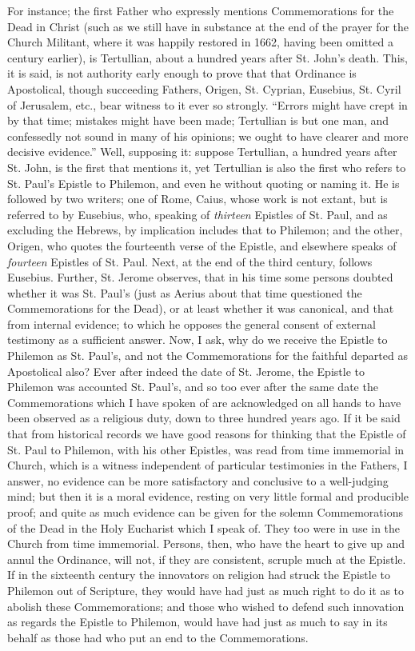 For instance; the first Father who expressly mentions
Commemorations for the Dead in Christ (such as we still have in
substance at the end of the prayer for the Church Militant, where it
was happily restored in 1662, having been omitted a century earlier),
is Tertullian, about a hundred years after St. John's death. This, it
is said, is not authority early enough to prove that that Ordinance is
Apostolical, though succeeding Fathers, Origen, St. Cyprian, Eusebius,
St. Cyril of Jerusalem, etc., bear witness to it ever so strongly.
``Errors might have crept in by that time; mistakes might have been
made; Tertullian is but one man, and confessedly not sound in many of
his opinions; we ought to have clearer and more decisive
evidence.'' Well, supposing it: suppose Tertullian, a hundred
years after St. John, is the first that mentions it, yet Tertullian is
also the first who refers to St. Paul's Epistle to Philemon, and even
he without quoting or naming it. He is followed by two writers; one of
Rome, Caius, whose work is not extant, but is referred to by Eusebius,
who, speaking of \emph{thirteen} Epistles of St. Paul, and as
excluding the Hebrews, by implication includes that to Philemon; and
the other, Origen, who quotes the fourteenth verse of the Epistle, and
elsewhere speaks of \emph{fourteen} Epistles of St. Paul. Next, at the
end of the third century, follows Eusebius. Further, St. Jerome
observes, that in his time some persons doubted whether it was St.
Paul's (just as Aerius about that time questioned the Commemorations
for the Dead), or at least whether it was canonical, and that from
internal evidence; to which he opposes the general consent of external
testimony as a sufficient answer. Now, I ask, why do we receive
the Epistle to Philemon as St. Paul's, and not the Commemorations for
the faithful departed as Apostolical also? Ever after indeed the date
of St. Jerome, the Epistle to Philemon was accounted St. Paul's, and
so too ever after the same date the Commemorations which I have spoken
of are acknowledged on all hands to have been observed as a religious
duty, down to three hundred years ago. If it be said that from
historical records we have good reasons for thinking that the Epistle
of St. Paul to Philemon, with his other Epistles, was read from time
immemorial in Church, which is a witness independent of particular
testimonies in the Fathers, I answer, no evidence can be more
satisfactory and conclusive to a well-judging mind; but then it is a
moral evidence, resting on very little formal and producible proof;
and quite as much evidence can be given for the solemn Commemorations
of the Dead in the Holy Eucharist which I speak of. They too were in
use in the Church from time immemorial. Persons, then, who have the
heart to give up and annul the Ordinance, will not, if they are
consistent, scruple much at the Epistle. If in the sixteenth century
the innovators on religion had struck the Epistle to Philemon out of
Scripture, they would have had just as much right to do it as to
abolish these Commemorations; and those who wished to defend such
innovation as regards the Epistle to Philemon, would have had just as
much to say in its behalf as those had who put an end to the
Commemorations.

